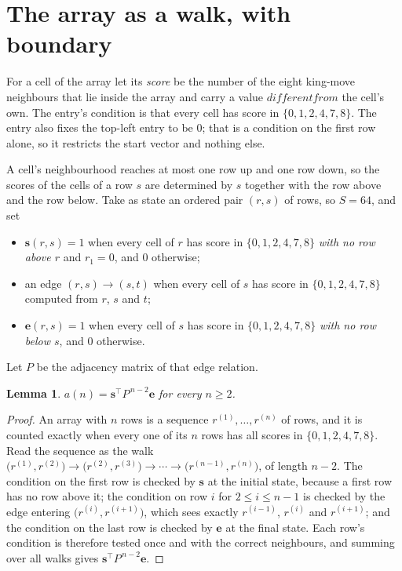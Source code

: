 \documentclass[11pt,a4paper]{article}
\theoremstyle{plain}
\newtheorem{lemma}[theorem]{Lemma}
\theoremstyle{definition}
\begin{document}
\section{The array as a walk, with boundary}

For a cell of the array let its \emph{score} be the number of the eight king-move neighbours that lie inside
the array and carry a value $different from$ the cell's own. The entry's condition is that every cell
has score in $\{0,1,2,4,7,8\}$. The entry also fixes the top-left entry to be $0$; that is a condition on the first row alone, so it restricts the start vector and nothing else.

A cell's neighbourhood reaches at most one row up and one row down, so the scores of the
cells of a row $s$ are determined by $s$ together with the row above and the row below.
Take as state an ordered pair $(r,s)$ of rows, so $S=64$, and set
\begin{itemize}
\item $\mathbf{s}(r,s)=1$ when every cell of $r$ has score in $\{0,1,2,4,7,8\}$ \emph{with no row
above $r$} and $r_1=0$, and $0$ otherwise;
\item an edge $(r,s)\to(s,t)$ when every cell of $s$ has score in $\{0,1,2,4,7,8\}$ computed from
$r$, $s$ and $t$;
\item $\mathbf{e}(r,s)=1$ when every cell of $s$ has score in $\{0,1,2,4,7,8\}$ \emph{with no row
below $s$}, and $0$ otherwise.
\end{itemize}
Let $P$ be the adjacency matrix of that edge relation.

\begin{lemma}\label{lem:walk}
$a(n)=\mathbf{s}^{\!\top}P^{\,n-2}\mathbf{e}$ for every $n\ge2$.
\end{lemma}

\begin{proof}
An array with $n$ rows is a sequence $r^{(1)},\dots,r^{(n)}$ of rows, and it is counted
exactly when every one of its $n$ rows has all scores in $\{0,1,2,4,7,8\}$. Read the sequence as the
walk $\bigl(r^{(1)},r^{(2)}\bigr)\to\bigl(r^{(2)},r^{(3)}\bigr)\to\cdots\to
\bigl(r^{(n-1)},r^{(n)}\bigr)$, of length $n-2$. The condition on the first row is
checked by $\mathbf{s}$ at the initial state, because a first row has no row above it; the
condition on row $i$ for $2\le i\le n-1$ is checked by the edge entering
$\bigl(r^{(i)},r^{(i+1)}\bigr)$, which sees exactly $r^{(i-1)}$, $r^{(i)}$ and
$r^{(i+1)}$; and the condition on the last row is checked by $\mathbf{e}$ at the final
state. Each row's condition is therefore tested once and with the correct neighbours, and
summing over all walks gives $\mathbf{s}^{\!\top}P^{\,n-2}\mathbf{e}$.
\end{proof}
\end{document}
